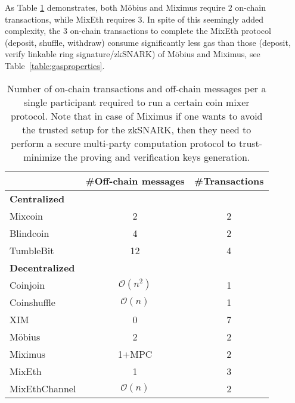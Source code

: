 \documentclass[conference, compsoc]{IEEEtran}
\theoremstyle{definition}
\begin{document}
As Table \ref{table:communicationcomplexity} demonstrates, both Möbius and Miximus require $2$ on-chain transactions, while MixEth requires $3$. In spite of this seemingly added complexity, the 3 on-chain transactions to complete the MixEth protocol (deposit, shuffle, withdraw) consume significantly less gas than those (deposit, verify linkable ring signature/zkSNARK) of Möbius and Miximus, see Table~\ref{table:gasproperties}. 
\begin{table}
	\caption{Number of on-chain transactions and off-chain messages per a single participant required to run a certain coin mixer protocol. Note that in case of Miximus if one wants to avoid the trusted setup for the zkSNARK, then they need to perform a secure multi-party computation protocol to trust-minimize the proving and verification keys generation.}
	\centering 
	\begin{tabular}{lcc} 
		
		\toprule
		&\#Off-chain messages& \#Transactions \\
		\midrule
		\textbf{Centralized} & & \\
		\midrule
		Mixcoin \cite{bonneau2014mixcoin} & 2      & 2       \\
		Blindcoin \cite{valenta2015blindcoin} & 4      & 2       \\
		TumbleBit \cite{heilman2017tumblebit} & 12      & 4      \\
		\midrule
		\textbf{Decentralized}      &    &      \\
		\midrule
		Coinjoin \cite{maxwell2013coinjoin} &  $\mathcal{O}(n^2)$     & 1       \\
		Coinshuffle \cite{ruffing2014coinshuffle} &$\mathcal{O}(n)$       & 1       \\
		XIM \cite{bissias2014sybil} & 0      & 7       \\
		Möbius \cite{meiklejohn2018mobius} & 2    & 2       \\
		Miximus \cite{miximus2018} & 1+MPC & 2 \\
		MixEth & 1 & 3 \\
		MixEthChannel  & $\mathcal{O}(n)$ &2 \\
		\bottomrule
	\end{tabular}
	\label{table:communicationcomplexity}
\end{table}
\end{document}
